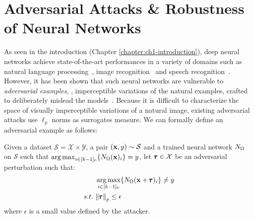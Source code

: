 %
%





\section{Adversarial Attacks \& Robustness of Neural Networks}
\label{section:ch2-preliminaries_on_adversarial_attacks}

As seen in the introduction (Chapter \ref{chapter:ch1-introduction}), deep neural networks achieve state-of-the-art performances in a variety of domains such as natural language processing~\cite{radford2018Language}, image recognition~\cite{he2016deep} and speech recognition~\cite{hinton2012deep}.
However, it has been shown that such neural networks are vulnerable to \emph{adversarial examples}, \ie, imperceptible variations of the natural examples, crafted to deliberately mislead the models~\cite{globerson2006nightmare,biggio2013evasion,szegedy2013intriguing}.
Because it is difficult to characterize the space of visually imperceptible variations of a natural image, existing adversarial attacks use $\ell_p$ norms as surrogates measure.
We can formally define an adversarial example as follows:
\begin{definition}
  Given a dataset $\mathcal{S} = \mathcal{X} \times \mathcal{Y}$, a pair $(\mathbf{x}, y) \sim \mathcal{S}$ and a trained neural network $N_\Omega$ on $\mathcal{S}$ such that $\operatorname*{arg\,max}_{i \in [k-1]_0} \{ N_\Omega(\mathbf{x})_i \} = y$, let $\pmb{\tau} \in \mathcal{X}$ be an adversarial perturbation such that:
  \begin{align}
    &\operatorname*{arg\,max}_{i \in [k-1]_0} \{ N_\Omega (\mathbf{x} + \pmb{\tau})_i \} \neq y \\
    s.t.\ &\norm{\pmb{\tau}}_p \leq \epsilon \notag
  \end{align}
  where $\epsilon$ is a small value defined by the attacker. 
\end{definition}

